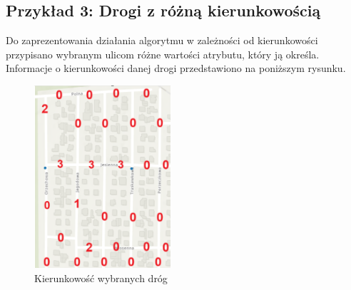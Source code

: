 \documentclass{article}
\begin{document}
\subsection{Przykład 3: Drogi z różną kierunkowością}
Do zaprezentowania działania algorytmu w zależności od kierunkowości przypisano wybranym ulicom różne wartości atrybutu, który ją określa. Informacje o kierunkowości danej
drogi przedstawiono na poniższym rysunku.
\begin{figure}[H]
    \centering
    \includegraphics[width=0.45\textwidth]{img/kierunek-opis.png}
    \caption{Kierunkowość wybranych dróg}
\end{figure}
\end{document}
